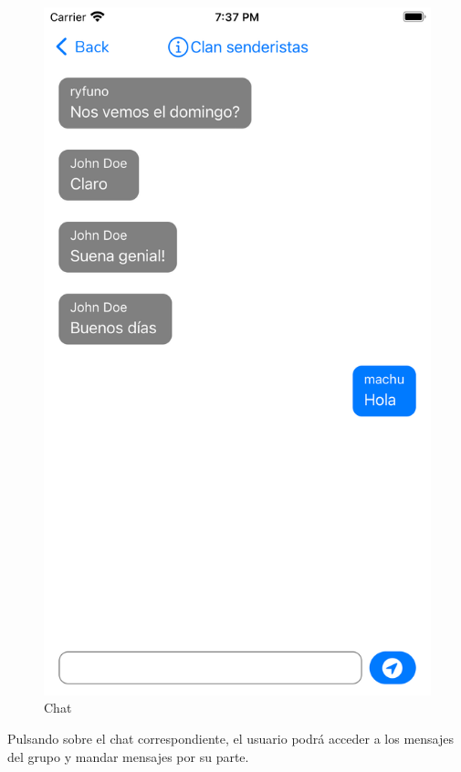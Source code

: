 \begin{appendices}
\begin{figure}[H]
\begin{minipage}{0.3\textwidth}
        \end{minipage}
        \begin{minipage}{0.3\textwidth}
            \centering
            \includegraphics[cframe=black 2pt,width=1\linewidth]{images/manual/ejemploChat.png}
        \end{minipage}
        \caption{Chat}
        \label{fig:chat}

\end{figure}
Pulsando sobre el chat correspondiente, el usuario podrá acceder a los mensajes del grupo y mandar mensajes por su parte.


\end{appendices}
